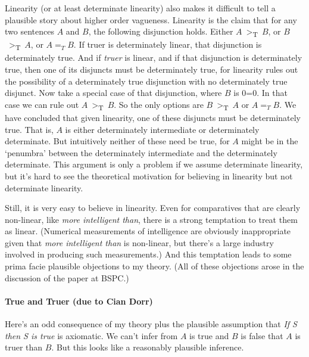 Linearity (or at least determinate linearity) also makes it difficult to
tell a plausible story about higher order vagueness. Linearity is the
claim that for any two sentences \(A\) and \(B\), the following
disjunction holds. Either \(A\)~{\textgreater{}}\textsubscript{T}~\(B\),
or \(B\)~{\textgreater{}}\textsubscript{T}~\(A\), or \(A =_T B\). If
truer is determinately linear, that disjunction is determinately true.
And if \emph{truer} is linear, and if that disjunction is determinately
true, then one of its disjuncts must be determinately true, for
linearity rules out the possibility of a determinately true disjunction
with no determinately true disjunct. Now take a special case of that
disjunction, where \(B\) is 0=0. In that case we can rule out
\(A\)~{\textgreater{}}\textsubscript{T}~\(B\). So the only options are
\(B\)~{\textgreater{}}\textsubscript{T}~\(A\) or \(A =_T B\). We have
concluded that given linearity, one of these disjuncts must be
determinately true. That is, \(A\) is either determinately intermediate
or determinately determinate. But intuitively neither of these need be
true, for \(A\) might be in the `penumbra' between the determinately
intermediate and the determinately determinate. This argument is only a
problem if we assume determinate linearity, but it's hard to see the
theoretical motivation for believing in linearity but not determinate
linearity.

Still, it is very easy to believe in linearity. Even for comparatives
that are clearly non-linear, like \emph{more intelligent than}, there is
a strong temptation to treat them as linear. (Numerical measurements of
intelligence are obviously inappropriate given that \emph{more
intelligent than} is non-linear, but there's a large industry involved
in producing such measurements.) And this temptation leads to some prima
facie plausible objections to my theory. (All of these objections arose
in the discussion of the paper at BSPC.)

\hypertarget{true-and-truer-due-to-cian-dorr}{%
\paragraph*{True and Truer (due to Cian
Dorr)}\label{true-and-truer-due-to-cian-dorr}}

Here's an odd consequence of my theory plus the plausible assumption
that \emph{If S then S is true} is axiomatic. We can't infer from \(A\)
is true and \(B\) is false that \(A\) is truer than \(B\). But this
looks like a reasonably plausible inference.

